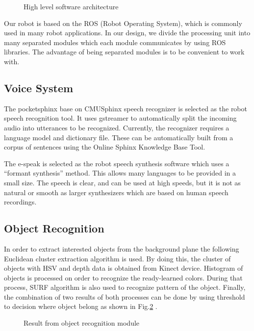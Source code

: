 \documentclass{llncs}
\newcommand{\dq}[1]{``#1''}
\begin{document}
\begin{figure}
\centering
\caption{High level software architecture}
\label{fig:soft_arc}
\end{figure}

Our robot is based on the ROS (Robot Operating System), which is commonly used in many robot applications. In our design, we divide the processing unit into many separated modules which each module communicates by using ROS libraries. The advantage of being separated modules is to be convenient to work with.

\subsection{Voice System}

The pocketsphinx base on CMUSphinx speech recognizer is selected as the robot speech recognition tool. It uses gstreamer to automatically split the incoming audio into utterances to be recognized. Currently, the recognizer requires a language model and dictionary file. These can be automatically built from a corpus of sentences using the Online Sphinx Knowledge Base Tool.

The e-speak is selected as the robot speech synthesis software which uses a \dq{formant synthesis} method. This allows many languages to be provided in a small size. The speech is clear, and can be used at high speeds, but it is not as natural or smooth as larger synthesizers which are based on human speech recordings.

\subsection{Object Recognition}

In order to extract interested objects from the background plane the following Euclidean cluster extraction algorithm\cite{ece}\cite{rudu.thesis} is used. By doing this, the cluster of objects with HSV and depth data is obtained from Kinect device. Histogram of objects is processed on order to recognize the ready-learned colors. During that process, SURF algorithm is also used to recognize pattern of the object. Finally, the combination of two results of both processes can be done by using threshold to decision where object belong as shown in Fig.\ref{fig:object_recog} .

\begin{figure}
\centering
\caption{Result from object recognition module}
\label{fig:object_recog}
\end{figure}
\end{document}
